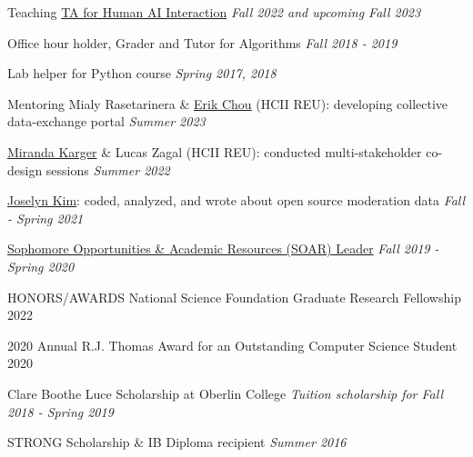 \documentclass{resume}
\begin{document}
\begin{rSection}{Teaching}
{\href{https://sites.google.com/andrew.cmu.edu/haii-cmu/}{TA for Human AI Interaction}} \hfill  {\em Fall 2022 and upcoming Fall 2023} 

{Office hour holder, Grader and Tutor for Algorithms} \hfill {\em Fall 2018 - 2019} 

{Lab helper for Python course} \hfill {\em Spring 2017, 2018} 



\end{rSection}

\begin{rSection}{Mentoring}
{Mialy Rasetarinera \& \href{https://echou.notion.site/echou/Erik-Chou-bb52b39b95924d3bbd62a83593e28ab6}{Erik Chou} (HCII REU): developing collective data-exchange portal} \hfill  {\em Summer 2023} 

{\href{https://miranda.karger.org/}{Miranda Karger} \& Lucas Zagal (HCII REU): conducted multi-stakeholder co-design sessions} \hfill  {\em Summer 2022} 

{\href{https://www.joselynkim.com/}{Joselyn Kim}: coded, analyzed, and wrote about open source moderation data} \hfill  {\em Fall - Spring 2021} 

{\href{https://www.oberlin.edu/career/set/soar/soar-leaders}{Sophomore Opportunities \& Academic Resources (SOAR) Leader}} \hfill{\em Fall 2019 - Spring 2020}

\end{rSection}

\begin{rSection}{HONORS/AWARDS}
{National Science Foundation Graduate Research Fellowship} \hfill{2022} 

{2020 Annual R.J. Thomas Award for an Outstanding Computer Science Student} \hfill{2020} 

{Clare Boothe Luce Scholarship at Oberlin College} \hfill{\em Tuition scholarship for Fall 2018 - Spring 2019} 


{STRONG Scholarship \& IB Diploma recipient }\hfill{\em Summer 2016}

\end{rSection}
\end{document}
